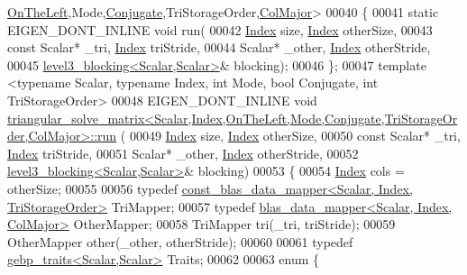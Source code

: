\begin{DoxyCode}
      \hyperlink{group__enums_ggac22de43beeac7a78b384f99bed5cee0ba129609b3bdf23b071f5f86cf2f995ec4}{OnTheLeft},Mode,\hyperlink{class_eigen_1_1_conjugate}{Conjugate},TriStorageOrder,\hyperlink{group__enums_ggaacded1a18ae58b0f554751f6cdf9eb13a0cbd4bdd0abcfc0224c5fcb5e4f6669a}{ColMajor}>
00040 \{
00041   \textcolor{keyword}{static} EIGEN\_DONT\_INLINE \textcolor{keywordtype}{void} run(
00042     \hyperlink{namespace_eigen_a62e77e0933482dafde8fe197d9a2cfde}{Index} size, \hyperlink{namespace_eigen_a62e77e0933482dafde8fe197d9a2cfde}{Index} otherSize,
00043     \textcolor{keyword}{const} Scalar* \_tri, \hyperlink{namespace_eigen_a62e77e0933482dafde8fe197d9a2cfde}{Index} triStride,
00044     Scalar* \_other, \hyperlink{namespace_eigen_a62e77e0933482dafde8fe197d9a2cfde}{Index} otherStride,
00045     \hyperlink{class_eigen_1_1internal_1_1level3__blocking}{level3\_blocking<Scalar,Scalar>}& blocking);
00046 \};
00047 \textcolor{keyword}{template} <\textcolor{keyword}{typename} Scalar, \textcolor{keyword}{typename} Index, \textcolor{keywordtype}{int} Mode, \textcolor{keywordtype}{bool} Conjugate, \textcolor{keywordtype}{int} TriStorageOrder>
00048 EIGEN\_DONT\_INLINE \textcolor{keywordtype}{void} 
      \hyperlink{struct_eigen_1_1internal_1_1triangular__solve__matrix}{triangular\_solve\_matrix<Scalar,Index,OnTheLeft,Mode,Conjugate,TriStorageOrder,ColMajor>::run}
      (
00049     \hyperlink{namespace_eigen_a62e77e0933482dafde8fe197d9a2cfde}{Index} size, \hyperlink{namespace_eigen_a62e77e0933482dafde8fe197d9a2cfde}{Index} otherSize,
00050     \textcolor{keyword}{const} Scalar* \_tri, \hyperlink{namespace_eigen_a62e77e0933482dafde8fe197d9a2cfde}{Index} triStride,
00051     Scalar* \_other, \hyperlink{namespace_eigen_a62e77e0933482dafde8fe197d9a2cfde}{Index} otherStride,
00052     \hyperlink{class_eigen_1_1internal_1_1level3__blocking}{level3\_blocking<Scalar,Scalar>}& blocking)
00053   \{
00054     \hyperlink{namespace_eigen_a62e77e0933482dafde8fe197d9a2cfde}{Index} cols = otherSize;
00055 
00056     \textcolor{keyword}{typedef} \hyperlink{class_eigen_1_1internal_1_1const__blas__data__mapper}{const\_blas\_data\_mapper<Scalar, Index, TriStorageOrder>}
       TriMapper;
00057     \textcolor{keyword}{typedef} \hyperlink{class_eigen_1_1internal_1_1blas__data__mapper}{blas\_data\_mapper<Scalar, Index, ColMajor>} OtherMapper;
00058     TriMapper tri(\_tri, triStride);
00059     OtherMapper other(\_other, otherStride);
00060 
00061     \textcolor{keyword}{typedef} \hyperlink{class_eigen_1_1internal_1_1gebp__traits}{gebp\_traits<Scalar,Scalar>} Traits;
00062 
00063     \textcolor{keyword}{enum} \{

\end{DoxyCode}
